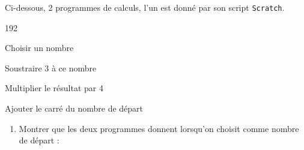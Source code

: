 \documentclass[main.tex]{subfiles}
\begin{document}
\begin{exercise}\hfill 
	
	\noindent	Ci-dessous, 2 programmes de calculs, l'un est donné par son script \texttt{Scratch}. 
	
	\noindent\begin{minipage}{0.45\columnwidth}\centering 
		\begin{mdframed}[default, frametitle={Programme A}]
			\begin{dingautolist}{192}
				\item Choisir un nombre
				\item Soustraire 3 à ce nombre
				\item Multiplier le résultat par 4
				\item Ajouter le carré du nombre de départ
			\end{dingautolist}
		\end{mdframed}
	\end{minipage}
	\hfill
	\begin{minipage}{0.5\columnwidth}\centering
		\begin{mdframed}[default, frametitle={Programme B}]
			\begin{scratch}[num blocks=true, scale=0.9]
			\end{scratch} 
		\end{mdframed} 
	\end{minipage}
	
\begin{enumerate}[label={\alph*)}, leftmargin=*] 
	\item Montrer que les deux programmes donnent \fg{} lorsqu’on choisit \fg{} comme nombre de départ :
	

\end{enumerate}
\end{exercise}
\end{document}
